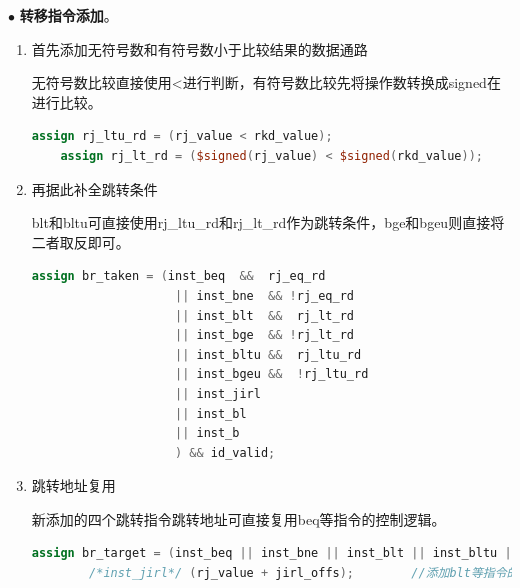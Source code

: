 \documentclass[11pt]{article}
\begin{document}
\noindent
$\bullet$
\textbf{转移指令添加}。
\begin{enumerate}
    \item 首先添加无符号数和有符号数小于比较结果的数据通路

    无符号数比较直接使用<进行判断，有符号数比较先将操作数转换成signed在进行比较。

    \begin{lstlisting}[language=verilog]
    assign rj_ltu_rd = (rj_value < rkd_value);                                   //无符号数比较：GR[rj]小于GR[rd]                          
    assign rj_lt_rd = ($signed(rj_value) < $signed(rkd_value));       //有符号数比较：GR[rj]小于GR[rd]
    \end{lstlisting}

    \item 再据此补全跳转条件

    blt和bltu可直接使用rj\_ltu\_rd和rj\_lt\_rd作为跳转条件，bge和bgeu则直接将二者取反即可。

    \begin{lstlisting}[language=verilog]
    assign br_taken = (inst_beq  &&  rj_eq_rd
                    || inst_bne  && !rj_eq_rd
                    || inst_blt  &&  rj_lt_rd                                 //添加blt等指令的跳转条件
                    || inst_bge  && !rj_lt_rd
                    || inst_bltu &&  rj_ltu_rd
                    || inst_bgeu &&  !rj_ltu_rd
                    || inst_jirl
                    || inst_bl
                    || inst_b
                    ) && id_valid;
    \end{lstlisting}

    \item 跳转地址复用

    新添加的四个跳转指令跳转地址可直接复用beq等指令的控制逻辑。

    \begin{lstlisting}[language=verilog]
    assign br_target = (inst_beq || inst_bne || inst_blt || inst_bltu || inst_bge || inst_bgeu || inst_bl || inst_b) ? (id_pc + br_offs) :
        /*inst_jirl*/ (rj_value + jirl_offs);        //添加blt等指令的跳转地址：与bne,beq相同
    \end{lstlisting}
\end{enumerate}
\end{document}
